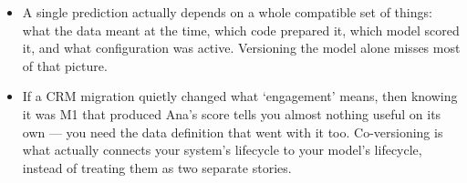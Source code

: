 \documentclass[11pt,a4paper]{article}
\begin{document}
\begin{examplebox}[title after break={SPOKEN SCRIPT --- slide 32 continued}]
\begin{itemize}
\item A single prediction actually depends on a whole compatible set of things: what the data meant at the time, which code prepared it, which model scored it, and what configuration was active. Versioning the model alone misses most of that picture.
\item If a CRM migration quietly changed what ‘engagement’ means, then knowing it was M1 that produced Ana's score tells you almost nothing useful on its own — you need the data definition that went with it too. Co-versioning is what actually connects your system's lifecycle to your model's lifecycle, instead of treating them as two separate stories.
\end{itemize}
\end{examplebox}
\par\noindent{\scriptsize\textcolor{teal!60!black}{Reading anchor: Kalinowski, Ch. 13–14 · Bass, Ch. 11 / §14.1}}
\clearpage
\end{document}
